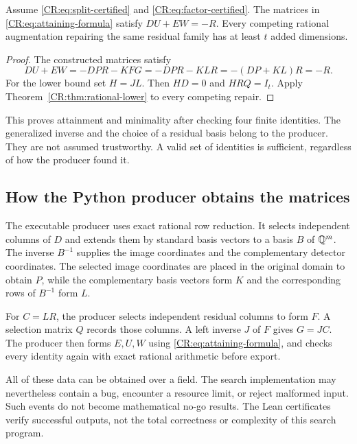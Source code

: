 \begin{CRtheorem}\label{CR:thm:matrix-attainment}
Assume \eqref{CR:eq:split-certified} and \eqref{CR:eq:factor-certified}. The matrices in \eqref{CR:eq:attaining-formula} satisfy $DU+EW=-R$. Every competing rational augmentation repairing the same residual family has at least $t$ added dimensions.
\end{CRtheorem}
\begin{proof}
The constructed matrices satisfy
\[
 DU+EW=-DPR-KFG=-DPR-KLR=-(DP+KL)R=-R.
\]
For the lower bound set $H=JL$. Then $HD=0$ and $HRQ=I_t$. Apply Theorem~\ref{CR:thm:rational-lower} to every competing repair.
\end{proof}

This proves attainment and minimality after checking four finite identities. The generalized inverse and the choice of a residual basis belong to the producer. They are not assumed trustworthy. A valid set of identities is sufficient, regardless of how the producer found it.

\subsection{How the Python producer obtains the matrices}
The executable producer uses exact rational row reduction. It selects independent columns of $D$ and extends them by standard basis vectors to a basis $B$ of $\mathbb{Q}^m$. The inverse $B^{-1}$ supplies the image coordinates and the complementary detector coordinates. The selected image coordinates are placed in the original domain to obtain $P$, while the complementary basis vectors form $K$ and the corresponding rows of $B^{-1}$ form $L$.

For $C=LR$, the producer selects independent residual columns to form $F$. A selection matrix $Q$ records those columns. A left inverse $J$ of $F$ gives $G=JC$. The producer then forms $E,U,W$ using \eqref{CR:eq:attaining-formula}, and checks every identity again with exact rational arithmetic before export.

All of these data can be obtained over a field. The search implementation may nevertheless contain a bug, encounter a resource limit, or reject malformed input. Such events do not become mathematical no-go results. The Lean certificates verify successful outputs, not the total correctness or complexity of this search program.

